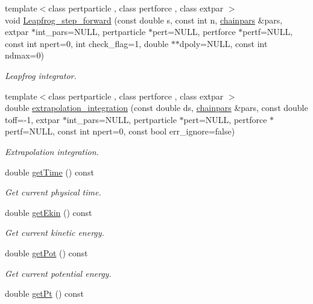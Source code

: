 \begin{DoxyCompactItemize}
{\footnotesize template$<$class pertparticle , class pertforce , class extpar $>$ }\\void \hyperlink{classARC_1_1chain_a80fd78294335c1990783ec562213342b}{Leapfrog\+\_\+step\+\_\+forward} (const double s, const int n, \hyperlink{classARC_1_1chainpars}{chainpars} \&pars, extpar $\ast$int\+\_\+pars=N\+U\+LL, pertparticle $\ast$pert=N\+U\+LL, pertforce $\ast$pertf=N\+U\+LL, const int npert=0, int check\+\_\+flag=1, double $\ast$$\ast$dpoly=N\+U\+LL, const int ndmax=0)
\begin{DoxyCompactList}\small\item\em Leapfrog integrator. \end{DoxyCompactList}\item 
{\footnotesize template$<$class pertparticle , class pertforce , class extpar $>$ }\\double \hyperlink{classARC_1_1chain_adedfb41cd82c64ca09dbc55a76b145fc}{extrapolation\+\_\+integration} (const double ds, \hyperlink{classARC_1_1chainpars}{chainpars} \&pars, const double toff=-\/1, extpar $\ast$int\+\_\+pars=N\+U\+LL, pertparticle $\ast$pert=N\+U\+LL, pertforce $\ast$pertf=N\+U\+LL, const int npert=0, const bool err\+\_\+ignore=false)
\begin{DoxyCompactList}\small\item\em Extrapolation integration. \end{DoxyCompactList}\item 
double \hyperlink{classARC_1_1chain_a48bde99d89b99df54844e1331d4814bb}{get\+Time} () const
\begin{DoxyCompactList}\small\item\em Get current physical time. \end{DoxyCompactList}\item 
double \hyperlink{classARC_1_1chain_ad7e8b3a20521f095a6935845f8a2ee53}{get\+Ekin} () const
\begin{DoxyCompactList}\small\item\em Get current kinetic energy. \end{DoxyCompactList}\item 
double \hyperlink{classARC_1_1chain_ae59c00c676af34f22c650076eb0aa83a}{get\+Pot} () const
\begin{DoxyCompactList}\small\item\em Get current potential energy. \end{DoxyCompactList}\item 
double \hyperlink{classARC_1_1chain_adbda281b80afe23f4b23d6a775046121}{get\+Pt} () const
$$
\end{DoxyCompactItemize}
